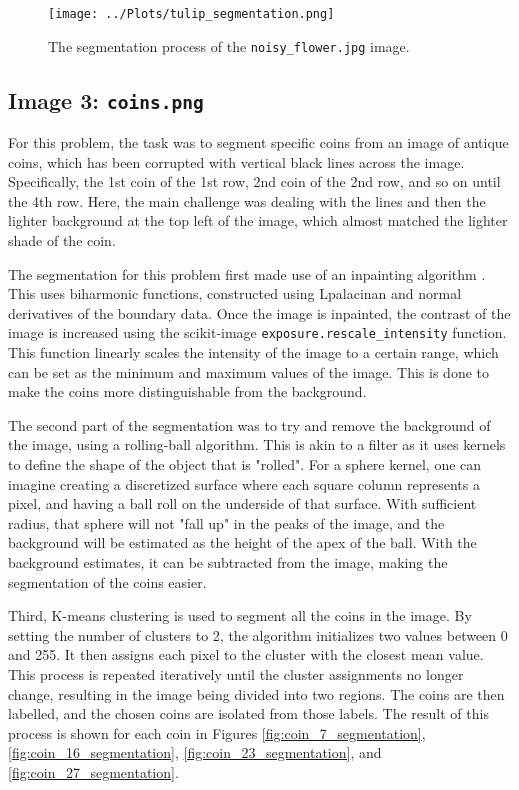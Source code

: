 \documentclass[12pt]{report} %
\begin{document}
\begin{figure}[htbp]
    \centering
    \texttt{[image: ../Plots/tulip\_segmentation.png]}
    \caption{The segmentation process of the \texttt{noisy\_flower.jpg} image.}
    \label{fig:tulip_segmentation}
\end{figure}

\subsection{Image 3: \texttt{coins.png}}

For this problem, the task was to segment specific coins from an image of antique coins, which has been corrupted with vertical black lines across the image. Specifically, the 1st coin of the 1st row, 2nd coin of the 2nd row, and so on until the 4th row. Here, the main challenge was dealing with the lines and then the lighter background at the top left of the image, which almost matched the lighter shade of the coin.

The segmentation for this problem first made use of an inpainting algorithm \cite{skimage_inpaint_biharmonic}. This uses biharmonic functions, constructed using Lpalacinan and normal derivatives of the boundary data\cite{damelin2018surface}. Once the image is inpainted, the contrast of the image is increased using the scikit-image \texttt{exposure.rescale\_intensity} function. This function linearly scales the intensity of the image to a certain range, which can be set as the minimum and maximum values of the image\cite{skimage_rescale_intensity}. This is done to make the coins more distinguishable from the background.

The second part of the segmentation was to try and remove the background of the image, using a rolling-ball algorithm. This is akin to a filter as it uses kernels to define the shape of the object that is "rolled". For a sphere kernel, one can imagine creating a discretized surface where each square column represents a pixel, and having a ball roll on the underside of that surface. With sufficient radius, that sphere will not "fall up" in the peaks of the image, and the background will be estimated as the height of the apex of the ball\cite{skimage_rolling_ball}. With the background estimates, it can be subtracted from the image, making the segmentation of the coins easier.

Third, K-means clustering is used to segment all the coins in the image. By setting the number of clusters to 2, the algorithm initializes two values between 0 and 255. It then assigns each pixel to the cluster with the closest mean value. This process is repeated iteratively until the cluster assignments no longer change, resulting in the image being divided into two regions\cite{sklearn_kmeans}. The coins are then labelled, and the chosen coins are isolated from those labels. The result of this process is shown for each coin in Figures \ref{fig:coin_7_segmentation}, \ref{fig:coin_16_segmentation}, \ref{fig:coin_23_segmentation}, and \ref{fig:coin_27_segmentation}.
\end{document}

